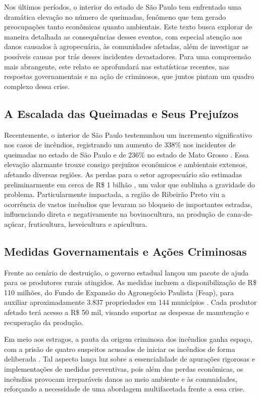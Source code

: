 \documentclass[
   article,       
   12pt,          
   oneside,       
   a4paper,       
   english,       
   brazil,        
   sumario=tradicional
   ]{abntex2}
\begin{document}
Nos últimos períodos, o interior do estado de São Paulo tem enfrentado uma dramática elevação no número de queimadas, fenômeno que tem gerado preocupações tanto econômicas quanto ambientais. Este texto busca explorar de maneira detalhada as consequências desses eventos, com especial atenção aos danos causados à agropecuária, às comunidades afetadas, além de investigar as possíveis causas por trás desses incidentes devastadores. Para uma compreensão mais abrangente, este relato se aprofundará nas estatísticas recentes, nas respostas governamentais e na ação de criminosos, que juntos pintam um quadro complexo dessa crise.

\subsection{A Escalada das Queimadas e Seus Prejuízos}

Recentemente, o interior de São Paulo testemunhou um incremento significativo nos casos de incêndios, registrando um aumento de 338\% nos incidentes de queimadas no estado de São Paulo e de 236\% no estado de Mato Grosso \cite{Semana_de_queimadas_teve_saltos_de_338_em_SP_}. Essa elevação alarmante trouxe consigo prejuízos econômicos e ambientais extensos, afetando diversas regiões. As perdas para o setor agropecuário são estimadas preliminarmente em cerca de R\$ 1 bilhão \cite{Queimadas_em_SP_causaram_prejuizo_de_R_1_bi_a}, um valor que sublinha a gravidade do problema. Particularmente impactada, a região de Ribeirão Preto viu a ocorrência de vastos incêndios que levaram ao bloqueio de importantes estradas, influenciando direta e negativamente na bovinocultura, na produção de cana-de-açúcar, fruticultura, heveicultura e apicultura.

\subsection{Medidas Governamentais e Ações Criminosas}

Frente ao cenário de destruição, o governo estadual lançou um pacote de ajuda para os produtores rurais atingidos. As medidas incluem a disponibilização de R\$ 110 milhões, do Fundo de Expansão do Agronegócio Paulista (Feap), para auxiliar aproximadamente 3.837 propriedades em 144 municípios \cite{Conheca_a_cidade_de_17_mil_habitantes_que_lid}. Cada produtor afetado terá acesso a R\$ 50 mil, visando suportar as despesas de manutenção e recuperação da produção.

Em meio aos estragos, a pauta da origem criminosa dos incêndios ganha espaço, com a prisão de quatro suspeitos acusados de iniciar os incêndios de forma deliberada \cite{Policia_prende_quarto_suspeito_de_participaca}. Tal aspecto lança luz sobre a essencialidade de apurações rigorosas e implementações de medidas preventivas, pois além das perdas econômicas, os incêndios provocam irreparáveis danos ao meio ambiente e às comunidades, reforçando a necessidade de uma abordagem multifacetada frente a essa crise.
\end{document}
